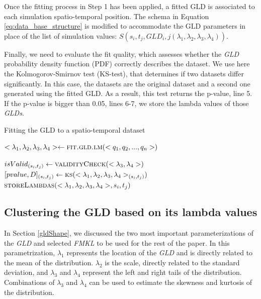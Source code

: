 \documentclass[11pt]{article}
\begin{document}
Once the fitting process in Step 1 has been applied, a fitted GLD is associated to each simulation spatio-temporal position. The schema in Equation \ref{eq:data_base_structure} is modified to accommodate the GLD parameters in place of the list of simulation values: $S(s_{i},t_{j},GLD_i,j(\lambda_1,\lambda_2,\lambda_3,\lambda_4))$.

Finally, we need to evaluate the fit quality, which assesses whether the
\textit{GLD} probability density function (PDF) correctly describes the dataset. We use here the Kolmogorov-Smirnov test (KS-test), that determines if two datasets differ significantly. In this case, the datasets are the original dataset and a second one generated using the fitted GLD. As a result, this test returns the p-value, line 5.
If the p-value is bigger than 0.05, lines 6-7, 
we store the lambda values of those \textit{GLDs}.


\begin{algorithm} 
\caption{Fitting the GLD to a spatio-temporal dataset}\label{alg:fitGLD}
\begin{algorithmic}[1] 
\State $<\lambda_{1},\lambda_{2},\lambda_{3},\lambda_{4}> \gets \Call {fit.gld.lm}{<q_1,q_2,...,q_n>}$

\State $isValid_{(s_{i},t_{j})} \gets \Call {validityCheck}{<\lambda_{3},\lambda_{4}>}$
\State $[pvalue,D]_{(s_{i},t_{j})} \gets \Call{ks}{<\lambda_{1},\lambda_{2},\lambda_{3},\lambda_{4}>_{(s_{i},t_{j})}}$
\EndIf
{}
\State $\Call{storeLambdas}{<\lambda_{1},\lambda_{2},\lambda_{3},\lambda_{4}>,s_{i},t_{j}}$
\EndIf
\EndFunction 
\end{algorithmic} 
\end{algorithm} 

\subsection{Clustering the GLD based on its lambda values}
\label{Clusterizing the GLD based in its lambda values}
In Section \ref{gldShape}, we discussed the two most important parameterizations of the \textit{GLD} and selected \textit{FMKL} to be used for the rest of the  paper. In this parametrization, $\lambda_{1}$ represents the location of the \textit{GLD} and is directly related to the mean of the distribution. $\lambda_{2}$ is the scale, directly related to the standard deviation, and $\lambda_{3}$ and $\lambda_{4}$ represent the left and right tails of the distribution. Combinations of $\lambda_{3}$ and $\lambda_{4}$ can be used to estimate the skewness and kurtosis of the distribution.
\end{document}
